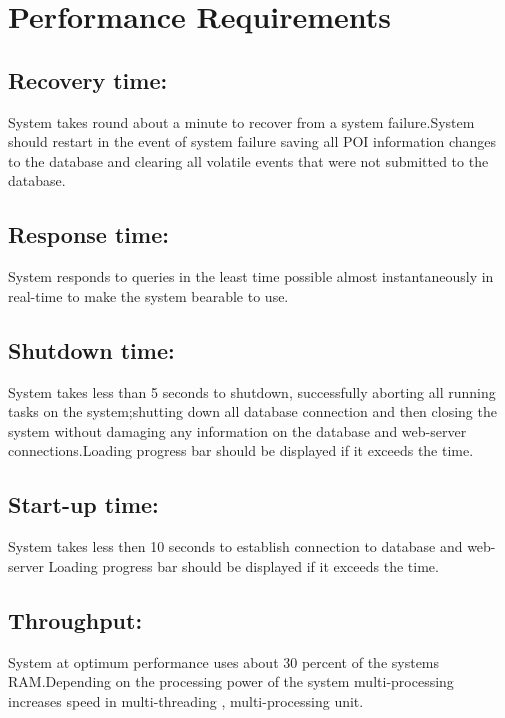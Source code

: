 \documentclass[11pt]{article}
\begin{document}
\section{Performance Requirements}
\subsection{Recovery time:}
	System takes round about a minute to recover from a system failure.System should 				restart in the event of system failure saving all POI information changes to the 				database and clearing all volatile events that were  not submitted to the database.
\subsection{Response time:}
	System responds to queries in the least time possible almost instantaneously in 				real-time  to make the system bearable to use.
\subsection{Shutdown time:}
	System takes less than 5 seconds to shutdown, successfully aborting all running 				tasks on the system;shutting down all database connection and then closing the system 			without damaging any information on the database and web-server connections.Loading 			progress bar should be displayed if it exceeds the time.
\subsection{Start-up time:}
	System takes less then 10 seconds to establish connection to database and web-server
	Loading progress bar should be displayed if it exceeds the time.
\subsection{Throughput:}
	System at optimum performance uses about 30 percent of the systems RAM.Depending on the 		processing power of the system multi-processing increases speed in multi-threading , 			multi-processing unit.
	
\end{document}
